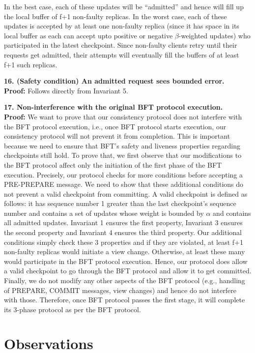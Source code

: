 \documentclass[twocolumn,10pt]{article}
\begin{document}
{In the best case,
each of these updates will be ``admitted'' and hence will fill up the local
buffer of f+1 non-faulty replicas. In the worst case, each of these updates
is accepted by at least one non-faulty replica (since it has space in its
local buffer as each can accept upto positive or negative $\beta$-weighted updates) who participated 
in the latest checkpoint. Since non-faulty clients retry until their requests
get admitted, their attempts will eventually fill the buffers of at least f+1 such replicas.

\textbf{16. (Safety condition) An admitted request sees bounded error.}\\
\textbf{Proof:} Follows directly from Invariant 5.
 

\textbf{17. Non-interference with the original BFT protocol execution.}\\
\textbf{Proof:} We want to prove that our consistency
protocol does not interfere with the BFT protocol execution, i.e., once BFT protocol
starts execution, our consistency protocol will not prevent it from completion. 
This is important because we need to ensure that BFT's 
safety and liveness properties regarding checkpoints still hold. To prove that,
we first observe that our modifications to the BFT protocol affect only the 
initiation of the first phase of the BFT execution. Precisely, our protocol
checks for more conditions before accepting a PRE-PREPARE message. We need to show
that these additional conditions do not prevent a valid checkpoint from committing. A 
valid checkpoint is defined as follows: it has sequence number 1 greater than the last
checkpoint's sequence number and contains a set of updates whose weight is bounded by
$\alpha$ and contains all admitted updates. Invariant 1 ensures the first property,
Invariant 3 ensures the second property and Invariant 4 ensures the third property.
Our additional conditions simply check these 3 properties and if they are violated,
at least f+1 non-faulty replicas would initiate a view change. Otherwise, at least these
many would participate in the BFT protocol execution. Hence, our protocol does allow
a valid checkpoint to go through the BFT protocol and allow it to get committed.
Finally, we do not modify any other aspects of the BFT protocol (e.g., handling of
PREPARE, COMMIT messages, view changes) and hence do not interfere with those.
Therefore, once BFT protocol passes the first stage, it will complete its 3-phase
protocol as per the BFT protocol.

\section{Observations}
}
\end{document}
